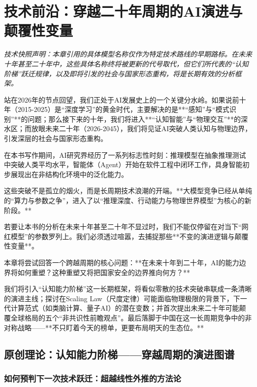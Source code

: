 \chapter{技术前沿：穿越二十年周期的AI演进与颠覆性变量}

\noindent\textit{技术快照声明：本章引用的具体模型名称仅作为特定技术路线的早期路标。在未来十年甚至二十年中，这些具体名称终将被更新的代号取代，但它们所代表的“认知阶梯”跃迁规律，以及即将引发的社会与国家形态重构，将是长期有效的分析框架。}

\bigskip

站在2026年的节点回望，我们正处于AI发展史上的一个关键分水岭。如果说前十年（2015-2025）是“深度学习”的黄金时代，主要解决的是**“感知”与“模式识别”**的问题；那么接下来的十年，我们将进入**“认知智能”与“物理交互”**的深水区；而放眼未来二十年（2026-2045），我们将见证AI突破人类认知与物理边界，引发深层的社会与国家形态重构。

在本书写作期间，AI研究界经历了一系列标志性时刻：推理模型在抽象推理测试中突破人类平均水平，智能体（Agent）开始在软件工程中闭环工作，具身智能初步展现出在非结构化环境中的泛化能力。

这些突破不是孤立的烟火，而是长周期技术浪潮的开端。**大模型竞争已经从单纯的“算力与参数之争”，进入了以“推理深度、行动能力与物理世界模型”为核心的新阶段。**

若要让本书的分析在未来十年甚至二十年不显过时，我们不能仅停留在对当下“网红模型”的参数罗列上。我们必须透过喧嚣，去捕捉那些**不变的演进逻辑与颠覆性变量**。

本章将尝试回答一个跨越周期的核心问题：**在未来十年到二十年，AI的能力边界将如何重塑？这种重塑又将把国家安全的边界推向何方？**

我们将引入“认知能力阶梯”这一长期框架，将看似零散的技术突破串联成一条清晰的演进主线；探讨在Scaling Law（尺度定律）可能面临物理极限的背景下，下一代计算范式（如类脑计算、量子AI）的潜在变数；并首次提出未来二十年可能颠覆全球格局的五个“非共识性前瞻观点”。最后落脚于中国在这一长周期竞争中的非对称战略——**不只盯着今天的榜单，更要布局明天的生态位。**

\section{原创理论：认知能力阶梯——穿越周期的演进图谱}

\subsection{如何预判下一次技术跃迁：超越线性外推的方法论}

